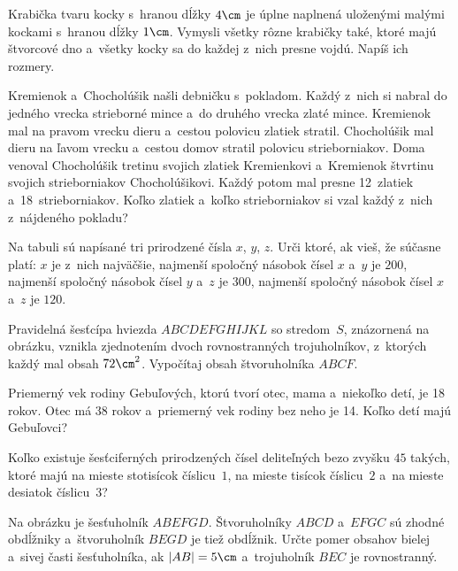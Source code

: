 {%
Krabička tvaru kocky s~hranou dĺžky $4\cm$ je úplne naplnená uloženými malými kockami s~hranou dĺžky $1\cm$. Vymysli všetky rôzne krabičky také, ktoré majú štvorcové dno a~všetky kocky sa do každej z~nich presne vojdú. Napíš ich rozmery.}

{%
Kremienok a~Chocholúšik našli debničku s~pokladom. Každý z~nich si nabral do jedného vrecka strieborné mince a~do druhého vrecka zlaté mince. Kremienok mal na pravom vrecku dieru a~cestou polovicu zlatiek stratil. Chocholúšik mal dieru na ľavom vrecku a~cestou domov stratil polovicu strieborniakov. Doma venoval Chocholúšik tretinu svojich zlatiek Kremienkovi a~Kremienok štvrtinu svojich strieborniakov Chocholúšikovi. Každý potom mal presne 12~zlatiek a~18~strieborniakov. Koľko zlatiek a~koľko strieborniakov si vzal každý z~nich z~nájdeného pokladu?}

{%
Na tabuli sú napísané tri prirodzené čísla $x$, $y$, $z$. Urči ktoré, ak vieš, že súčasne platí:
\itemitem{$\bullet$} $x$ je z~nich najväčšie,
\itemitem{$\bullet$} najmenší spoločný násobok čísel $x$ a~$y$ je $200$,
\itemitem{$\bullet$} najmenší spoločný násobok čísel $y$ a~$z$ je $300$,
\itemitem{$\bullet$} najmenší spoločný násobok čísel $x$ a~$z$ je $120$.
}

{%
Pravidelná šesťcípa hviezda $ABCDEFGHIJKL$ so stredom~$S$, znázornená na obrázku, vznikla zjednotením dvoch rovnostranných trojuholníkov, z~ktorých každý mal obsah $72\cm^2$. Vypočítaj obsah štvoruholníka $ABCF$.
}

{%
Priemerný vek rodiny Gebuľových, ktorú tvorí otec, mama a~niekoľko detí, je 18 rokov. Otec má 38 rokov a~priemerný vek rodiny bez neho je 14. Koľko detí majú Gebuľovci?}

{%
Koľko existuje šesťciferných prirodzených čísel deliteľných bezo zvyšku $45$ takých, ktoré majú na mieste stotisícok číslicu~$1$, na mieste tisícok číslicu~$2$ a~na mieste desiatok číslicu~$3$?}

{%
Na obrázku je šesťuholník $ABEFGD$. Štvoruholníky $ABCD$ a~$EFGC$ sú zhodné obdĺžniky a~štvoruholník $BEGD$ je tiež obdĺžnik. Určte pomer obsahov bielej a~sivej časti šesťuholníka, ak $|AB|=5\cm$ a~trojuholník $BEC$ je rovnostranný.
%
}

